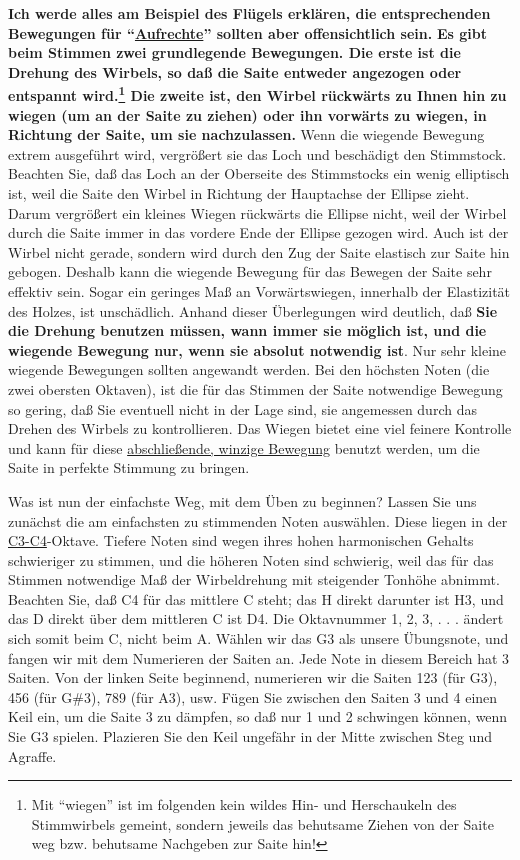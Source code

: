 \textbf{Ich werde alles am Beispiel des Flügels erklären, die entsprechenden Bewegungen für \enquote{\hyperref[upright]{Aufrechte}} sollten aber offensichtlich sein.}
\textbf{Es gibt beim Stimmen zwei grundlegende Bewegungen.
Die erste ist die Drehung des Wirbels, so daß die Saite entweder angezogen oder entspannt wird.\footnote{Mit \enquote{wiegen} ist im folgenden kein wildes Hin- und Herschaukeln des Stimmwirbels gemeint, sondern jeweils das behutsame Ziehen von der Saite weg bzw. behutsame Nachgeben zur Saite hin!}
Die zweite ist, den Wirbel rückwärts zu Ihnen hin zu wiegen (um an der Saite zu ziehen) oder ihn vorwärts zu wiegen, in Richtung der Saite, um sie nachzulassen.}
Wenn die wiegende Bewegung extrem ausgeführt wird, vergrößert sie das Loch und beschädigt den Stimmstock.
Beachten Sie, daß das Loch an der Oberseite des Stimmstocks ein wenig elliptisch ist, weil die Saite den Wirbel in Richtung der Hauptachse der Ellipse zieht.
Darum vergrößert ein kleines Wiegen rückwärts die Ellipse nicht, weil der Wirbel durch die Saite immer in das vordere Ende der Ellipse gezogen wird.
Auch ist der Wirbel nicht gerade, sondern wird durch den Zug der Saite elastisch zur Saite hin gebogen.
Deshalb kann die wiegende Bewegung für das Bewegen der Saite sehr effektiv sein.
Sogar ein geringes Maß an Vorwärtswiegen, innerhalb der Elastizität des Holzes, ist unschädlich.
Anhand dieser Überlegungen wird deutlich, daß \textbf{Sie die Drehung benutzen müssen, wann immer sie möglich ist, und die wiegende Bewegung nur, wenn sie absolut notwendig ist}.
Nur sehr kleine wiegende Bewegungen sollten angewandt werden.
Bei den höchsten Noten (die zwei obersten Oktaven), ist die für das Stimmen der Saite notwendige Bewegung so gering, daß Sie eventuell nicht in der Lage sind, sie angemessen durch das Drehen des Wirbels zu kontrollieren.
Das Wiegen bietet eine viel feinere Kontrolle und kann für diese \hyperref[c2_5_infi]{abschließende, winzige Bewegung} benutzt werden, um die Saite in perfekte Stimmung zu bringen.

Was ist nun der einfachste Weg, mit dem Üben zu beginnen?
Lassen Sie uns zunächst die am einfachsten zu stimmenden Noten auswählen.
Diese liegen in der \hyperref[Noten]{C3-C4}-Oktave.
Tiefere Noten sind wegen ihres hohen harmonischen Gehalts schwieriger zu stimmen, und die höheren Noten sind schwierig, weil das für das Stimmen notwendige Maß der Wirbeldrehung mit steigender Tonhöhe abnimmt.
Beachten Sie, daß C4 für das mittlere C steht; das H direkt darunter ist H3, und das D direkt über dem mittleren C ist D4.
Die Oktavnummer 1, 2, 3, . . . ändert sich somit beim C, nicht beim A.
Wählen wir das G3 als unsere Übungsnote, und fangen wir mit dem Numerieren der Saiten an.
Jede Note in diesem Bereich hat 3 Saiten.
Von der linken Seite beginnend, numerieren wir die Saiten 123 (für G3), 456 (für G\#3), 789 (für A3), usw.
Fügen Sie zwischen den Saiten 3 und 4 einen Keil ein, um die Saite 3 zu dämpfen, so daß nur 1 und 2 schwingen können, wenn Sie G3 spielen.
Plazieren Sie den Keil ungefähr in der Mitte zwischen Steg und Agraffe.

